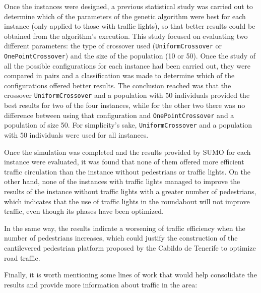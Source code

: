 Once the instances were designed, a previous statistical study was carried out to determine which of the parameters of the genetic algorithm were best for each instance (only applied to those with traffic lights), so that better results could be obtained from the algorithm's execution. This study focused on evaluating two different parameters: the type of crossover used (\texttt{UniformCrossover} or \texttt{OnePointCrossover}) and the size of the population (10 or 50). Once the study of all the possible configurations for each instance had been carried out, they were compared in pairs and a classification was made to determine which of the configurations offered better results. The conclusion reached was that the crossover \texttt{UniformCrossover} and a population with 50 individuals provided the best results for two of the four instances, while for the other two there was no difference between using that configuration and \texttt{OnePointCrossover} and a population of size 50. For simplicity's sake, \texttt{UniformCrossover} and a population with 50 individuals were used for all instances.

Once the simulation was completed and the results provided by SUMO for each instance were evaluated, it was found that none of them offered more efficient traffic circulation than the instance without pedestrians or traffic lights. On the other hand, none of the instances with traffic lights managed to improve the results of the instance without traffic lights with a greater number of pedestrians, which indicates that the use of traffic lights in the roundabout will not improve traffic, even though its phases have been optimized.

In the same way, the results indicate a worsening of traffic efficiency when the number of pedestrians increases, which could justify the construction of the cantilevered pedestrian platform proposed by the Cabildo de Tenerife to optimize road traffic.

Finally, it is worth mentioning some lines of work that would help consolidate the results and provide more information about traffic in the area:


